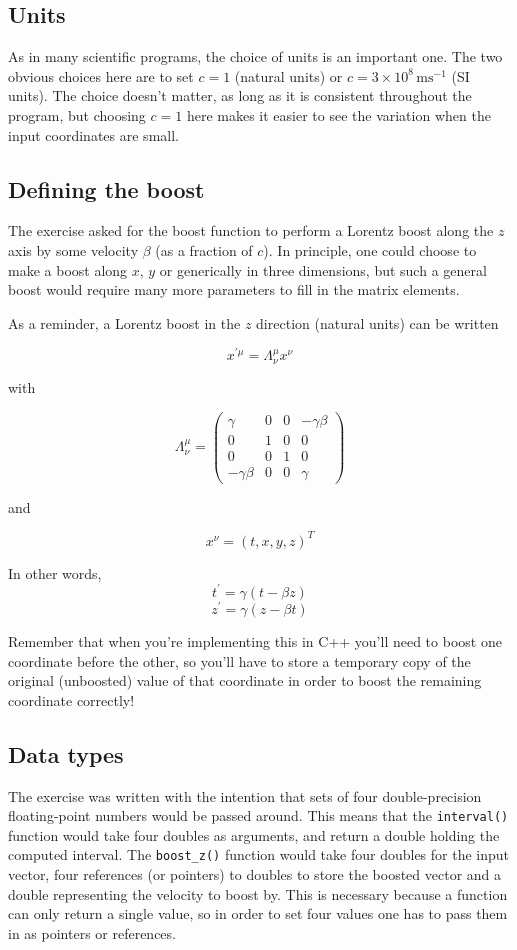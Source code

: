 \documentclass[a4paper]{scrartcl}
\begin{document}
\subsection{Units}
As in many scientific programs, the choice of units is an important one. The two obvious choices here are to set $c=1$ (natural units) or $c=3\times 10^8\,\mathrm{ms^{-1}}$ (SI units). The choice doesn't matter, as long as it is consistent throughout the program, but choosing $c=1$ here makes it easier to see the variation when the input coordinates are small.

\subsection{Defining the boost}
The exercise asked for the boost function to perform a Lorentz boost along the $z$ axis by some velocity $\beta$ (as a fraction of $c$). In principle, one could choose to make a boost along $x$, $y$ or generically in three dimensions, but such a general boost would require many more parameters to fill in the matrix elements.

As a reminder, a Lorentz boost in the $z$ direction (natural units) can be written

\[ x^{\prime\mu} = \Lambda^\mu_\nu x^\nu \]

with

\[ \Lambda^\mu_\nu = \left( \begin{array}{cccc} \gamma & 0 & 0 & -\gamma\beta \\ 0 & 1 & 0 & 0 \\ 0 & 0 & 1 & 0 \\ -\gamma\beta & 0 & 0 & \gamma \end{array} \right) \]

and

\[ x^\nu = (t,x,y,z)^T \]

In other words,
\[ t^\prime = \gamma(t - \beta z) \]
\[ z^\prime = \gamma(z - \beta t) \]

Remember that when you're implementing this in C++ you'll need to boost one coordinate before the other, so you'll have to store a temporary copy of the original (unboosted) value of that coordinate in order to boost the remaining coordinate correctly!

\subsection{Data types}
The exercise was written with the intention that sets of four double-precision floating-point numbers would be passed around. This means that the \verb|interval()| function would take four doubles as arguments, and return a double holding the computed interval. The \verb|boost_z()| function would take four doubles for the input vector, four references (or pointers) to doubles to store the boosted vector and a double representing the velocity to boost by. This is necessary because a function can only return a single value, so in order to set four values one has to pass them in as pointers or references.
\end{document}
